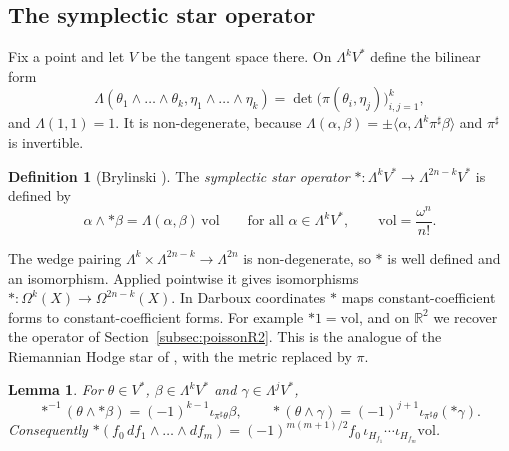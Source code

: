 \documentclass[11pt,oneside,reqno]{article}
\newcommand{\R}{\mathbb R}
\newcommand{\Om}{\Omega}
\newcommand{\vol}{\mathrm{vol}}
\theoremstyle{plain}
\newtheorem{lemma}[theorem]{Lemma}
\theoremstyle{definition}
\newtheorem{definition}[theorem]{Definition}
\theoremstyle{remark}
\begin{document}
\subsection{The symplectic star operator}\label{subsec:star}
Fix a point and let \(V\) be the tangent space there. On \(\Lambda^kV^*\) define the
bilinear form
\[
 \Lambda(\theta_1\wedge\dots\wedge\theta_k,\eta_1\wedge\dots\wedge\eta_k)=
 \det\bigl(\pi(\theta_i,\eta_j)\bigr)_{i,j=1}^k ,
\]
and \(\Lambda(1,1)=1\). It is non-degenerate, because
\(\Lambda(\alpha,\beta)=\pm\langle\alpha,\Lambda^k\pi^\sharp\beta\rangle\) and
\(\pi^\sharp\) is invertible.

\begin{definition}[Brylinski \cite{Brylinski}]
The \emph{symplectic star operator} \(*:\Lambda^kV^*\to\Lambda^{2n-k}V^*\) is
defined by
\[
 \alpha\wedge*\beta=\Lambda(\alpha,\beta)\,\vol\qquad\text{for all }\alpha\in\Lambda^kV^*,
 \qquad\vol=\frac{\omega^n}{n!}.
\]
\end{definition}

The wedge pairing \(\Lambda^k\times\Lambda^{2n-k}\to\Lambda^{2n}\) is non-degenerate, so \(*\) is
well defined and an isomorphism. Applied pointwise it gives isomorphisms
\(*:\Om^k(X)\to\Om^{2n-k}(X)\). In Darboux coordinates \(*\) maps
constant-coefficient forms to constant-coefficient forms. For example
\(*1=\vol\), and on \(\R^2\) we recover the operator of
Section~\ref{subsec:poissonR2}. This is the analogue of the Riemannian Hodge
star of \cite[\S``Formal adjoints and the Hodge star'']{LoyaAS}, with the
metric replaced by \(\pi\).

\begin{lemma}\label{lem:starlemma}
For \(\theta\in V^*\), \(\beta\in\Lambda^kV^*\) and \(\gamma\in\Lambda^jV^*\),
\[
 *^{-1}(\theta\wedge*\beta)=(-1)^{k-1}\iota_{\pi^\sharp\theta}\beta,\qquad
 *(\theta\wedge\gamma)=(-1)^{j+1}\iota_{\pi^\sharp\theta}(*\gamma).
\]
Consequently \(*(f_0\,df_1\wedge\dots\wedge df_m)=(-1)^{m(m+1)/2}f_0\,
\iota_{H_{f_1}}\cdots\iota_{H_{f_m}}\vol\).
\end{lemma}
\end{document}
